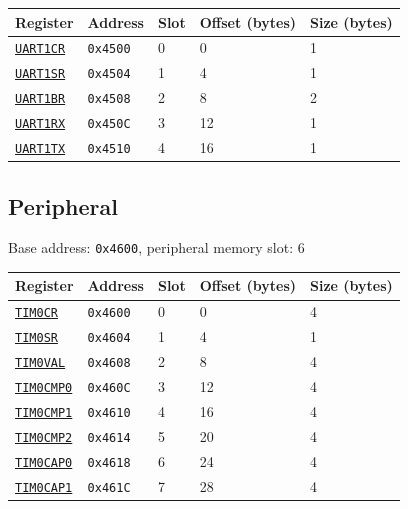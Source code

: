 \begin{tabularx}{\textwidth}{ l l l l X }
\textbf{Register} & \textbf{Address} & \textbf{Slot} & \textbf{Offset (bytes)} & \textbf{Size (bytes)} \\ \hline
\hyperref[ss:UARTxCR]{\texttt{UART1CR}} & \texttt{0x4500} & 0 & 0 & 1 \\
\rowcolor{tablehighlightcolor} \hyperref[ss:UARTxSR]{\texttt{UART1SR}} & \texttt{0x4504} & 1 & 4 & 1 \\
\hyperref[ss:UARTxBR]{\texttt{UART1BR}} & \texttt{0x4508} & 2 & 8 & 2 \\
\rowcolor{tablehighlightcolor} \hyperref[ss:UARTxRX]{\texttt{UART1RX}} & \texttt{0x450C} & 3 & 12 & 1 \\
\hyperref[ss:UARTxTX]{\texttt{UART1TX}} & \texttt{0x4510} & 4 & 16 & 1 \\
\hline
\end{tabularx}

\subsection{ Peripheral}
\noindent Base address: \texttt{0x4600}, peripheral memory slot: 6

\begin{tabularx}{\textwidth}{ l l l l X }
\textbf{Register} & \textbf{Address} & \textbf{Slot} & \textbf{Offset (bytes)} & \textbf{Size (bytes)} \\ \hline
\hyperref[ss:TIMxCR]{\texttt{TIM0CR}} & \texttt{0x4600} & 0 & 0 & 4 \\
\rowcolor{tablehighlightcolor} \hyperref[ss:TIMxSR]{\texttt{TIM0SR}} & \texttt{0x4604} & 1 & 4 & 1 \\
\hyperref[ss:TIMxVAL]{\texttt{TIM0VAL}} & \texttt{0x4608} & 2 & 8 & 4 \\
\rowcolor{tablehighlightcolor} \hyperref[ss:TIMxCMP0]{\texttt{TIM0CMP0}} & \texttt{0x460C} & 3 & 12 & 4 \\
\hyperref[ss:TIMxCMP1]{\texttt{TIM0CMP1}} & \texttt{0x4610} & 4 & 16 & 4 \\
\rowcolor{tablehighlightcolor} \hyperref[ss:TIMxCMP2]{\texttt{TIM0CMP2}} & \texttt{0x4614} & 5 & 20 & 4 \\
\hyperref[ss:TIMxCAP0]{\texttt{TIM0CAP0}} & \texttt{0x4618} & 6 & 24 & 4 \\
\rowcolor{tablehighlightcolor} \hyperref[ss:TIMxCAP1]{\texttt{TIM0CAP1}} & \texttt{0x461C} & 7 & 28 & 4 \\
\hline
\end{tabularx}

